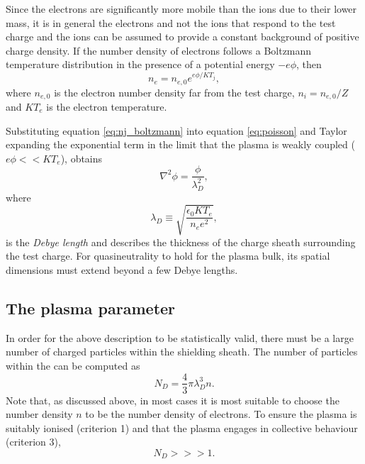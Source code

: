 Since the electrons are significantly more mobile than the ions due to their lower mass, it is in general the electrons and not the ions that respond to the test charge and the ions can be assumed to provide a constant background of positive charge density.
If the number density of electrons follows a Boltzmann temperature distribution in the presence of a potential energy $-e\phi$, then
\begin{equation}\label{eq:nj_boltzmann}
	n_e= n_{e,0}e^{e\phi/KT_j},
\end{equation}
where $n_{e,0}$ is the electron number density far from the test charge, $n_i = n_{e,0}/Z$ and $KT_e$ is the electron temperature.

Substituting equation \ref{eq:nj_boltzmann} into equation \ref{eq:poisson} and Taylor expanding the exponential term in the limit that the plasma is weakly coupled ($e\phi << KT_e$), obtains 
\begin{equation}\label{eq:poisson_debye2}
	\nabla^2\phi = \frac{\phi}{\lambda_D^2},
\end{equation}
where
\begin{equation}\label{eq:debye}
	\lambda_D \equiv \sqrt{\frac{\epsilon_0KT_e}{n_ee^2}},
\end{equation}
is the \textit{Debye length} and describes the thickness of the charge sheath surrounding the test charge. For quasineutrality to hold for the plasma bulk, its spatial dimensions must extend beyond a few Debye lengths.

\subsection{\label{sec:plasma_parameter}The plasma parameter}
In order for the above description to be statistically valid, there must be a large number of charged particles within the shielding sheath. The number of particles within the  can be computed as
\begin{equation}\label{eq:plasma_parameter}
	N_D = \frac{4}{3}\pi\lambda_D^3n.
\end{equation}
Note that, as discussed above, in most cases it is most suitable to choose the number density $n$ to be the number density of electrons. To ensure the plasma is suitably ionised (criterion 1) and that the plasma engages in collective behaviour (criterion 3),
\begin{equation}\label{eq:plasma_parameter_condition}
	N_D >>> 1.
\end{equation}
